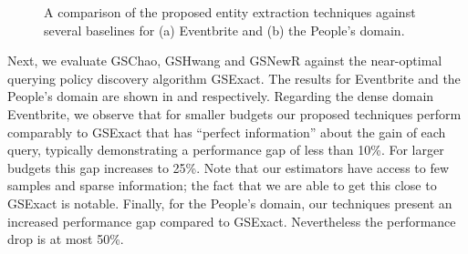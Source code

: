 \begin{figure}[h]
\begin{center}
\end{center}
\vspace{-20pt}
\caption{A comparison of the proposed entity extraction techniques against several baselines for (a) Eventbrite and (b) the People's domain.}
\label{fig:resultsextr}
\vspace{-15pt}
\end{figure}

\vspace{3pt}
Next, we evaluate GSChao, GSHwang and GSNewR against the near-optimal querying policy discovery algorithm GSExact. The results for Eventbrite and the People's domain are shown in  and  respectively. Regarding the dense domain Eventbrite, we observe that for smaller budgets our proposed techniques perform comparably to GSExact that has ``perfect information'' about the gain of each query, typically demonstrating a performance gap of less than 10\%. For larger budgets this gap increases to 25\%. Note that our estimators have access to few samples and sparse information; the fact that we are able to get this close to GSExact is notable. Finally, for the People's domain, our techniques present an increased performance gap compared to GSExact. Nevertheless the performance drop is at most 50\%. 

